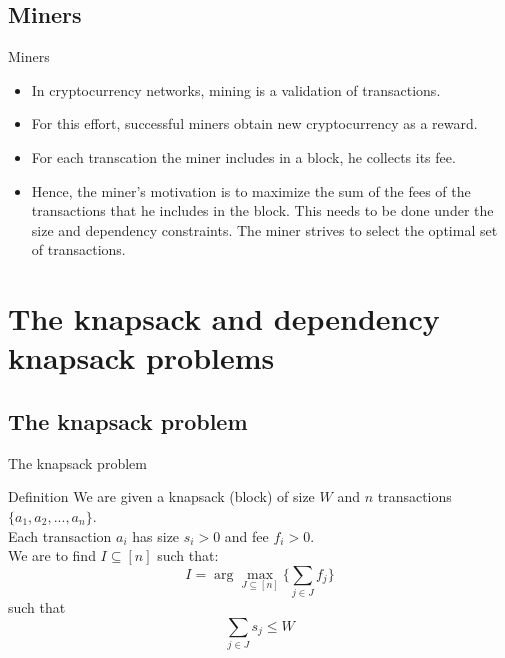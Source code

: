 \documentclass{beamer}
\begin{document}
\subsection*{Miners}

\begin{frame}{Miners}
    \begin{itemize}
        \item {In cryptocurrency networks, mining is a validation of 
        transactions.}
        \item {For this effort, successful miners obtain new cryptocurrency 
        as a reward.}
        \item {For each transcation the miner includes in a block, he 
        collects its fee.}
        \item {Hence, the miner's motivation is to maximize the sum of 
        the fees of the transactions that he includes in the block. This
        needs to be done under the size and dependency constraints. The
        miner strives to select the optimal set of transactions.}
    \end{itemize}
\end{frame}


\section{The knapsack and dependency knapsack problems}
\subsection*{The knapsack problem}

\begin{frame}{The knapsack problem}
    \begin{block}{Definition}
    We are given a knapsack (block) of size $W$ and $n$ transactions 
    $ \{a_1,a_2,...,a_n\}$. \\ 
    Each transaction $a_i$ has size $s_i > 0$ and fee $f_i > 0$. \\ 
    We are to find $ I \subseteq [n] $ such that: \\
    $$ I = \arg \max_{J \subseteq[n]} \{\sum_{j\in J} f_j\} $$ such that 
    $$ \sum_{j\in J} s_j \leq W $$
    \end{block}
\end{frame}
\end{document}

